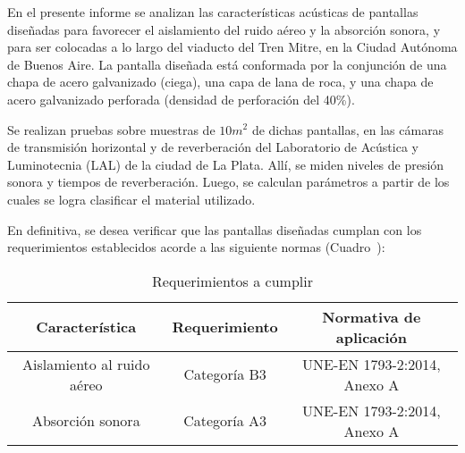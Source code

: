 \par En el presente informe se analizan las características acústicas de pantallas diseñadas para favorecer el aislamiento del ruido aéreo y la absorción sonora, y para ser colocadas a lo largo del viaducto del Tren Mitre, en la Ciudad Autónoma de Buenos Aire. 
La pantalla diseñada está conformada por la conjunción de  una chapa de acero galvanizado (ciega), una capa de lana de
roca, y una chapa de acero galvanizado perforada (densidad de perforación del 40\%).

\par Se realizan pruebas sobre muestras de $10 m^2$ de dichas pantallas, en las cámaras de transmisión horizontal y de reverberación del Laboratorio de Acústica y Luminotecnia (LAL) de la ciudad de La Plata. Allí, se miden niveles de presión sonora y tiempos de reverberación. Luego, se calculan parámetros a partir de los cuales se logra clasificar el material utilizado. 

\par En definitiva, se desea verificar que las pantallas diseñadas cumplan con los requerimientos establecidos acorde a las siguiente normas (Cuadro~):

\begin{table}[!h]
\setlength\arrayrulewidth{1pt}

    \centering
    \begin{tabular}{|c|c|c|} \hline
        \textbf{Característica} & \textbf{Requerimiento} & \textbf{Normativa de aplicación}\\ \hline
        Aislamiento al ruido aéreo & Categoría B3 & UNE-EN 1793-2:2014, Anexo A\\ \hline
        Absorción sonora & Categoría A3 & UNE-EN 1793-2:2014, Anexo A \\ \hline
    \end{tabular}
    \caption{Requerimientos a cumplir}
    \label{tab:requerimientos_a_cumplir}
\end{table}


